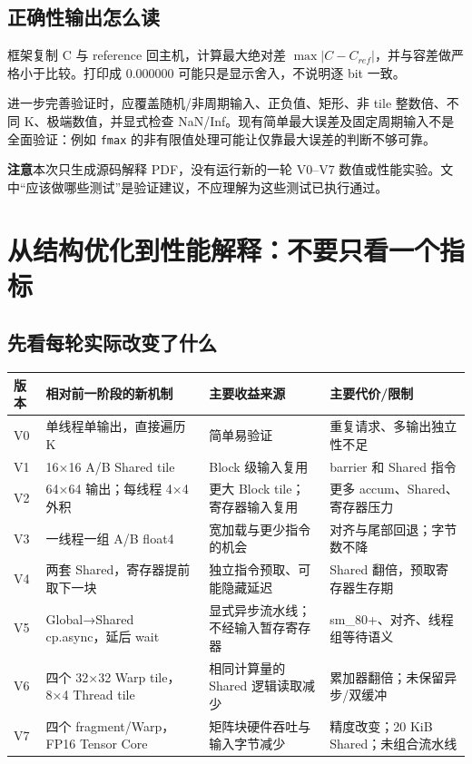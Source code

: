 \documentclass[UTF8,11pt,a4paper,fontset=fandol]{ctexart}
\newcommand{\code}[1]{\nolinkurl{#1}}
\newcommand{\caution}[1]{\par\noindent\colorbox{PaleOrange}{\parbox{\dimexpr\linewidth-2\fboxsep\relax}{\textbf{注意}\quad #1}}\par}
\newcommand{\pagebreakhere}{\clearpage}
\begin{document}
\subsection{正确性输出怎么读}
框架复制 C 与 reference 回主机，计算最大绝对差 $\max|C-C_{ref}|$，并与容差做严格小于比较。打印成 0.000000 可能只是显示舍入，不说明逐 bit 一致。

进一步完善验证时，应覆盖随机/非周期输入、正负值、矩形、非 tile 整数倍、不同 K、极端数值，并显式检查 NaN/Inf。现有简单最大误差及固定周期输入不是全面验证：例如 \code{fmax} 的非有限值处理可能让仅靠最大误差的判断不够可靠。

\caution{本次只生成源码解释 PDF，没有运行新的一轮 V0--V7 数值或性能实验。文中“应该做哪些测试”是验证建议，不应理解为这些测试已执行通过。}
\pagebreakhere

\section{从结构优化到性能解释：不要只看一个指标}
\subsection{先看每轮实际改变了什么}
\begin{longtable}{p{0.8cm}p{4.5cm}p{4.5cm}p{4.3cm}}
\toprule
版本 & 相对前一阶段的新机制 & 主要收益来源 & 主要代价/限制\\\midrule
\endhead
V0 & 单线程单输出，直接遍历 K & 简单易验证 & 重复请求、多输出独立性不足\\
V1 & 16×16 A/B Shared tile & Block 级输入复用 & barrier 和 Shared 指令\\
V2 & 64×64 输出；每线程 4×4 外积 & 更大 Block tile；寄存器输入复用 & 更多 accum、Shared、寄存器压力\\
V3 & 一线程一组 A/B float4 & 宽加载与更少指令的机会 & 对齐与尾部回退；字节数不降\\
V4 & 两套 Shared，寄存器提前取下一块 & 独立指令预取、可能隐藏延迟 & Shared 翻倍，预取寄存器生存期\\
V5 & Global→Shared cp.async，延后 wait & 显式异步流水线；不经输入暂存寄存器 & sm\_80+、对齐、线程组等待语义\\
V6 & 四个 32×32 Warp tile，8×4 Thread tile & 相同计算量的 Shared 逻辑读取减少 & 累加器翻倍；未保留异步/双缓冲\\
V7 & 四个 fragment/Warp，FP16 Tensor Core & 矩阵块硬件吞吐与输入字节减少 & 精度改变；20 KiB Shared；未组合流水线\\\bottomrule
\end{longtable}
\end{document}
